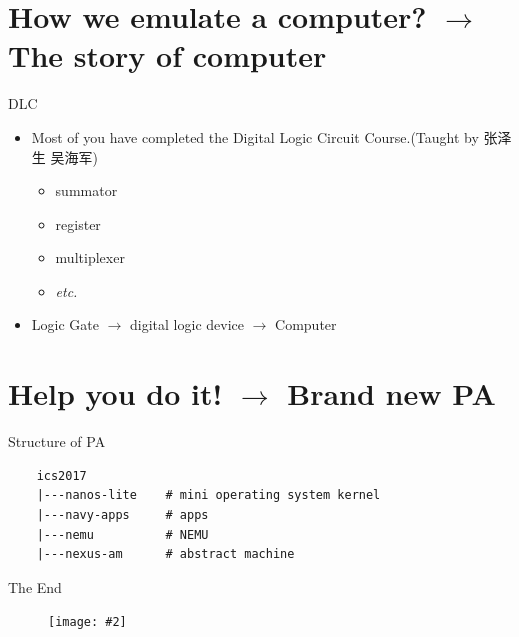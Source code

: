 \documentclass[handout]{beamer}
\newcommand{\fignocaption}[2]{
	\begin{figure}[htp]
		\centering
		\texttt{[image: \#2]}
	\end{figure}
}
\begin{document}
\section{How we emulate a computer? $\longrightarrow$ The story of computer}
\begin{frame}{DLC}
	\begin{itemize}
		\item Most of you have completed the Digital Logic Circuit Course.(Taught by 张泽生 吴海军)
			\begin{itemize}
				\item summator
				\item register
				\item multiplexer
				\item \textit{etc.}
			\end{itemize}
		\pause
		\item Logic Gate $\longrightarrow$ digital logic device $\longrightarrow$ Computer
	\end{itemize}
\end{frame}




\section{Help you do it! $\longrightarrow$ Brand new PA}
\begin{frame}[fragile]{Structure of PA}
\begin{verbatim}
    ics2017
    |---nanos-lite    # mini operating system kernel
    |---navy-apps     # apps
    |---nemu          # NEMU
    |---nexus-am      # abstract machine
\end{verbatim}
\end{frame}


\begin{frame}{The End}
	\fignocaption{scale=0.8}{studentFeedback.png}
\end{frame}
\end{document}
